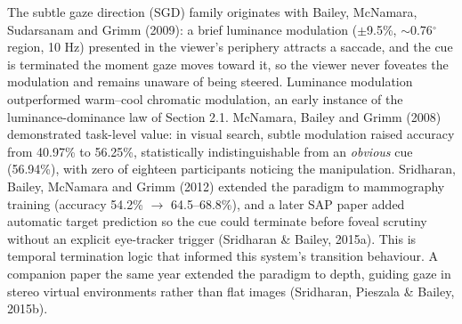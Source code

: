 The subtle gaze direction (SGD) family originates with Bailey, McNamara, Sudarsanam and Grimm (2009):
a brief luminance modulation ($\pm$9.5\%, $\sim$0.76$^{\circ}$ region, 10 Hz) presented in the viewer's periphery
attracts a saccade, and the cue is terminated the moment gaze moves toward it, so the viewer never
foveates the modulation and remains unaware of being steered. Luminance modulation outperformed
warm–cool chromatic modulation, an early instance of the luminance-dominance law of Section 2.1.
McNamara, Bailey and Grimm (2008) demonstrated task-level value: in visual search, subtle modulation
raised accuracy from 40.97\% to 56.25\%, statistically indistinguishable from an \textit{obvious} cue
(56.94\%), with zero of eighteen participants noticing the manipulation. Sridharan, Bailey, McNamara
and Grimm (2012) extended the paradigm to mammography training (accuracy 54.2\% $\rightarrow$ 64.5–68.8\%), and a
later SAP paper added automatic target prediction so the cue could terminate before foveal scrutiny
without an explicit eye-tracker trigger (Sridharan \& Bailey, 2015a). This is temporal termination
logic that informed this system's transition behaviour. A companion paper the same year extended the
paradigm to depth, guiding gaze in stereo virtual environments rather than flat images (Sridharan,
Pieszala \& Bailey, 2015b).

